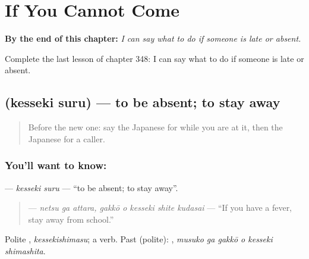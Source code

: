 
\chapter{If You Cannot Come}
\label{ch:ja-if-you-cannot-come}

\begin{chapteropening}
\textbf{By the end of this chapter:} \emph{I can say what to do if someone is late or absent.}

Complete the last lesson of chapter 348: I can say what to do if someone is late or absent.
\end{chapteropening}

\section[\texorpdfstring{\ja{けっせきする} (kesseki suru)}{けっせきする (kesseki suru)}]{ (kesseki suru) — to be absent; to stay away}

\label{lesson:JA-C348-kesseki-suru}



\begin{quote}
Before the new one: say the Japanese for while you are at it, then the Japanese for a caller.
\end{quote}

\subsection*{You'll want to know: }
\textbf{} — \emph{kesseki suru} — \textquotedblleft{}to be absent; to stay away\textquotedblright{}.

\begin{quote}
\textbf{   } — \emph{netsu ga attara, gakkō o kesseki shite kudasai} — \textquotedblleft{}If you have a fever, stay away from school.\textquotedblright{}
\end{quote}

Polite \textbf{}, \emph{kessekishimasu}; a  verb. Past (polite): \textbf{  }, \emph{musuko ga gakkō o kesseki shimashita}.

